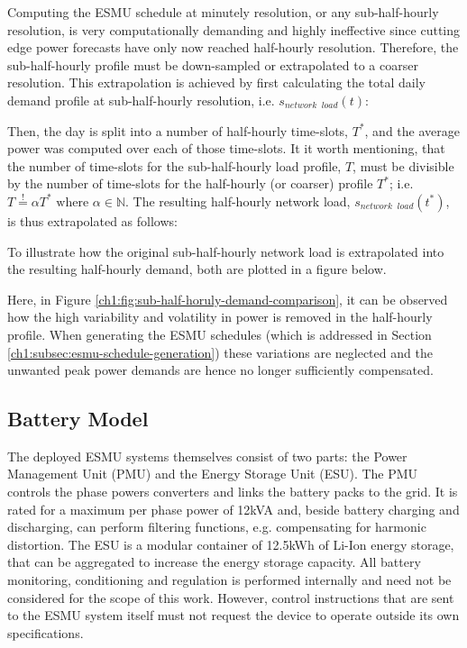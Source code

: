 Computing the ESMU schedule at minutely resolution, or any sub-half-hourly resolution, is very computationally demanding and highly ineffective since cutting edge power forecasts have only now reached half-hourly resolution.
Therefore, the sub-half-hourly profile must be down-sampled or extrapolated to a coarser resolution.
This extrapolation is achieved by first calculating the total daily demand profile at sub-half-hourly resolution, i.e. $s_{network\;\;load}(t)$:



Then, the day is split into a number of half-hourly time-slots, $T^*$, and the average power was computed over each of those time-slots.
It it worth mentioning, that the number of time-slots for the sub-half-hourly load profile, $T$, must be divisible by the number of time-slots for the half-hourly (or coarser) profile $T^*$; i.e. $T \overset{!}{=} \alpha T^* \text{ where } \alpha \in \mathbb{N}$.
The resulting half-hourly network load, $s_{network\;\;load}(t^*)$, is thus extrapolated as follows:



To illustrate how the original sub-half-hourly network load is extrapolated into the resulting half-hourly demand, both are plotted in a figure below.



Here, in Figure \ref{ch1:fig:sub-half-horuly-demand-comparison}, it can be observed how the high variability and volatility in power is removed in the half-hourly profile.
When generating the ESMU schedules (which is addressed in Section \ref{ch1:subsec:esmu-schedule-generation}) these variations are neglected and the unwanted peak power demands are hence no longer sufficiently compensated.

\subsection{Battery Model}

The deployed ESMU systems themselves consist of two parts: the Power Management Unit (PMU) and the Energy Storage Unit (ESU).
The PMU controls the phase powers converters and links the battery packs to the grid.
It is rated for a maximum per phase power of 12kVA and, beside battery charging and discharging, can perform filtering functions, e.g. compensating for  harmonic distortion.
The ESU is a modular container of 12.5kWh of Li-Ion energy storage, that can be aggregated to increase the energy storage capacity.
All battery monitoring, conditioning and regulation is performed internally and need not be considered for the scope of this work.
However, control instructions that are sent to the ESMU system itself must not request the device to operate outside its own specifications.

